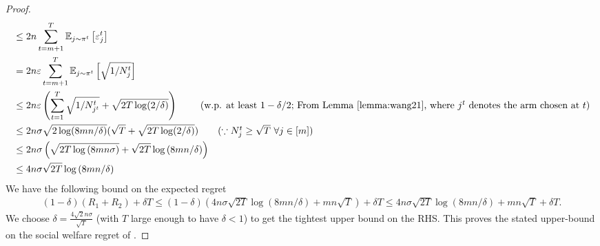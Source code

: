 \begin{proof}
\begin{align*}
    & \leq 2n \sum_{t=m+1}^T \mathbb{E}_{j \sim \pi^t} \left[\varepsilon^{t}_{j}\right]   \\
    &=   2 n \varepsilon \sum_{t=m+ 1}^T \mathbb{E}_{j \sim \pi^t}\left[\sqrt{1/N_j^t}\right] \\ 
& \leq   2n \varepsilon \left( \sum_{t=1}^T \sqrt{1/N_{j^t}^{t}} + \sqrt{2T\log(2/\delta)} \right) \ \tag{w.p. at least $1-\delta/2$; From Lemma \ref{lemma:wang21}, where $j^t$ denotes the arm chosen at $t$}\\
& \leq  2n\sigma \sqrt{2\log(8mn/\delta)}  ( \sqrt{T} + \sqrt{2T\log(2/\delta)}) \tag{$\because N^t_{j}\geq \sqrt{T} \ \forall j \in [m]$} \\
&\leq 2n\sigma \left(\sqrt{2T\log{(8mn\sigma)}} + \sqrt{2T}\log{(8mn/\delta)} \right)\\
&\leq 4n\sigma  \sqrt{2T}\log{(8mn/\delta)}
\end{align*}
We have the following bound on the expected regret
\begin{align*}
(1-\delta)(R_1+R_2)+\delta T \leq (1-\delta)(4n\sigma \sqrt{2T}\log{(8mn/\delta)} + mn\sqrt{T})  + \delta T\leq 4n\sigma \sqrt{2T}\log{(8mn/\delta)} + mn\sqrt{T} + \delta T.
\end{align*}
We choose $\delta=\frac{4\sqrt{2}n\sigma }{\sqrt{T}}$ (with $T$ large enough to have $\delta<1$) to get the tightest upper bound on the RHS. This proves the stated upper-bound on the social welfare regret of \ouralgo.

\end{proof}


